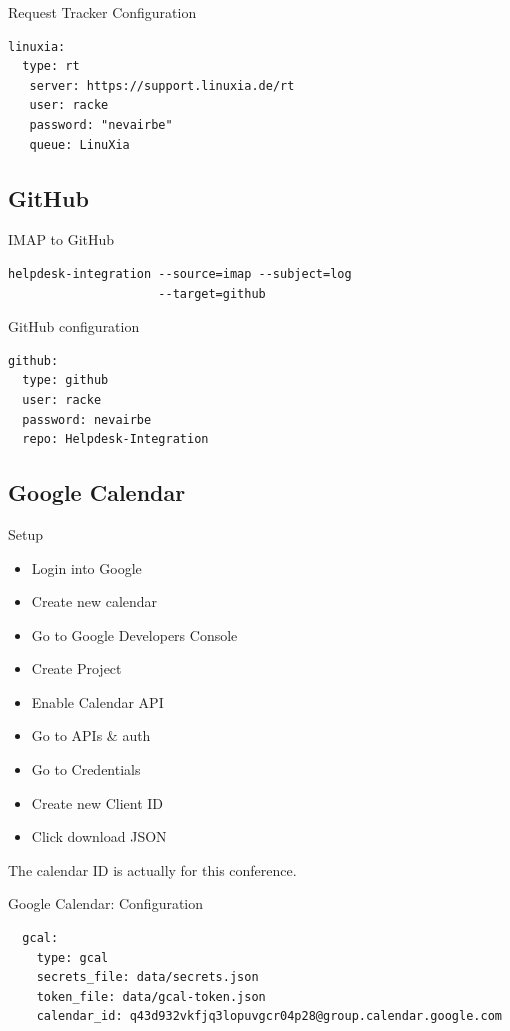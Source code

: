 \begin{frame}[fragile]{Request Tracker Configuration}
\begin{lstlisting}
linuxia:
  type: rt
   server: https://support.linuxia.de/rt
   user: racke
   password: "nevairbe"
   queue: LinuXia
\end{lstlisting}
\end{frame}

\subsection{GitHub}

\begin{frame}[fragile]{IMAP to GitHub}
\begin{lstlisting}
helpdesk-integration --source=imap --subject=log 
                     --target=github
\end{lstlisting}
\end{frame}

\begin{frame}[fragile]{GitHub configuration}
\begin{lstlisting}
github:
  type: github
  user: racke
  password: nevairbe
  repo: Helpdesk-Integration
\end{lstlisting}
\end{frame}


\subsection{Google Calendar}

\begin{frame}{Setup}
\begin{itemize}
\item Login into Google
\item Create new calendar
\item Go to Google Developers Console
\item Create Project
\item Enable Calendar API
\item Go to APIs \& auth 
\item Go to Credentials
\item Create new Client ID
\item Click download JSON
\end{itemize}
\end{frame}

The calendar ID is actually for this conference.

\begin{frame}[fragile]{Google Calendar: Configuration}
\begin{lstlisting}
  gcal:
    type: gcal
    secrets_file: data/secrets.json
    token_file: data/gcal-token.json
    calendar_id: q43d932vkfjq3lopuvgcr04p28@group.calendar.google.com
\end{lstlisting}
\end{frame}

